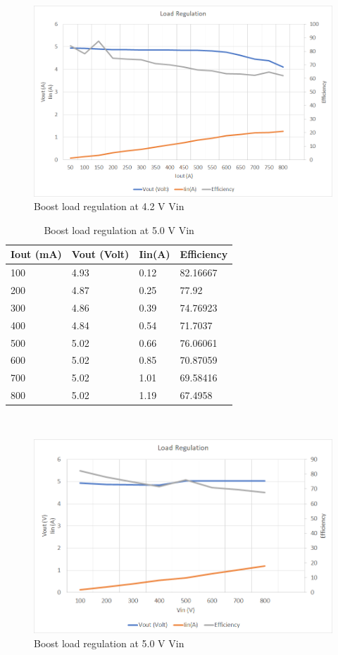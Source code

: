 \\ 
\begin{figure}[H]
	\centering
	\includegraphics[width=0.9\columnwidth]{IMGS/Boost load regulation at 4.2V Vin.png}
	\caption{Boost load regulation at 4.2 V Vin}
	\label{fig:arch}
\end{figure}
\begin{table}[H]
\centering
\begin{tabular}{|l|l|l|l|}
\hline
Iout (mA) & Vout (Volt) & Iin(A) & Efficiency \\ \hline
100       & 4.93        & 0.12   & 82.16667   \\ \hline
200       & 4.87        & 0.25   & 77.92      \\ \hline
300       & 4.86        & 0.39   & 74.76923   \\ \hline
400       & 4.84        & 0.54   & 71.7037    \\ \hline
500       & 5.02        & 0.66   & 76.06061   \\ \hline
600       & 5.02        & 0.85   & 70.87059   \\ \hline
700       & 5.02        & 1.01   & 69.58416   \\ \hline
800       & 5.02        & 1.19   & 67.4958    \\ \hline
\end{tabular}
\caption{Boost load regulation at 5.0 V Vin}
\label{table:4}
\end{table}
\\
\begin{figure}[H]
	\centering
	\includegraphics[width=\columnwidth]{IMGS/Boost load regulation at 5V Vin.png}
	\caption{Boost load regulation at 5.0 V Vin}
	\label{fig:arch}
\end{figure}

